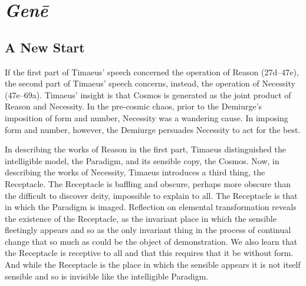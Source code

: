 
\chapter{\emph{Genē}} %
\label{cha:gene}

\section{A New Start} %
\label{sec:a_new_start}

If the first part of Timaeus' speech concerned the operation of Reason (27d--47e), the second part of Timaeus' speech concerns, instead, the operation of Necessity (47e--69a). Timaeus' insight is that Cosmos is generated as the joint product of Reason and Necessity. In the pre-cosmic chaos, prior to the Demiurge's imposition of form and number, Necessity was a wandering cause. In imposing form and number, however, the Demiurge persuades Necessity to act for the best.


In describing the works of Reason in the first part, Timaeus distinguished the intelligible model, the Paradigm, and its sensible copy, the Cosmos. Now, in describing the works of Necessity, Timaeus introduces a third thing, the Receptacle. The Receptacle is baffling and obscure, perhaps more obscure than the difficult to discover deity, impossible to explain to all. The Receptacle is that in which the Paradigm is imaged. Reflection on elemental transformation reveals the existence of the Receptacle, as the invariant place in which the sensible fleetingly appears and so as the only invariant thing in the process of continual change that so much as could be the object of demonstration. We also learn that the Receptacle is receptive to all and that this requires that it be without form. And while the Receptacle is the place in which the sensible appears it is not itself sensible and so is invisible like the intelligible Paradigm.

